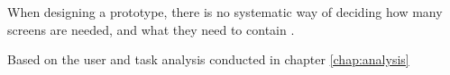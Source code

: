 When designing a prototype, there is no systematic way of deciding how many screens are needed, and what they need to contain \cite{lauesen}.


Based on the user and task analysis conducted in chapter \ref{chap:analysis}



